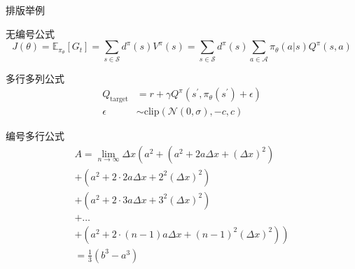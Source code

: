 \documentclass[compress,aspectratio=43,10pt,UTF8]{ctexbeamer}
\begin{document}
\begin{frame}{排版举例}
	
	\begin{block}{无编号公式}
        \begin{equation*}
            J(\theta) = \mathbb{E}_{\pi_\theta}[G_t] = \sum_{s\in\mathcal{S}} d^\pi (s)V^\pi(s)=\sum_{s\in\mathcal{S}} d^\pi(s)\sum_{a\in\mathcal{A}}\pi_\theta(a|s)Q^\pi(s,a)
        \end{equation*}
    \end{block}
    \begin{block}{多行多列公式\footnotemark[1]}
        \begin{align}
            Q_\mathrm{target}&=r+\gamma Q^\pi(s^\prime, \pi_\theta(s^\prime)+\epsilon)\\
            \epsilon&\sim\mathrm{clip}(\mathcal{N}(0, \sigma), -c, c)\nonumber
        \end{align}
    \end{block}
\end{frame}

\begin{frame}
    \begin{block}{编号多行公式}
        \begin{multline}
            A=\lim_{n\rightarrow\infty}\Delta x\left(a^{2}+\left(a^{2}+2a\Delta x+\left(\Delta x\right)^{2}\right)\right.\label{eq:reset}\\
            +\left(a^{2}+2\cdot2a\Delta x+2^{2}\left(\Delta x\right)^{2}\right)\\
            +\left(a^{2}+2\cdot3a\Delta x+3^{2}\left(\Delta x\right)^{2}\right)\\
            +\ldots\\
            \left.+\left(a^{2}+2\cdot(n-1)a\Delta x+(n-1)^{2}\left(\Delta x\right)^{2}\right)\right)\\
            =\frac{1}{3}\left(b^{3}-a^{3}\right)
        \end{multline}
    \end{block}
\end{frame}
\end{document}
